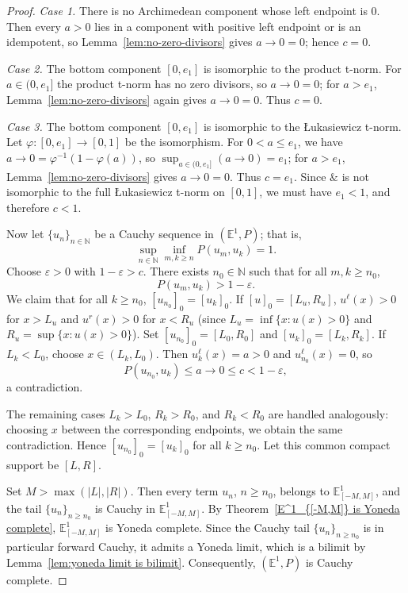 \documentclass[preprint,3p,times]{elsarticle}
\theoremstyle{plain}
\theoremstyle{definition}
\renewcommand{\phi}{\varphi}
\numberwithin{equation}{section}
\begin{document}
\begin{proof}
\emph{Case 1.} There is no Archimedean component whose left endpoint is $0$. Then every $a>0$ lies in a component with positive left endpoint or is an idempotent, so Lemma~\ref{lem:no-zero-divisors} gives $a\to0=0$; hence $c=0$.

\emph{Case 2.} The bottom component $[0,e_1]$ is isomorphic to the product t-norm. For $a\in(0,e_1]$ the product t-norm has no zero divisors, so $a\to0=0$; for $a>e_1$, Lemma~\ref{lem:no-zero-divisors} again gives $a\to0=0$. Thus $c=0$.

\emph{Case 3.} The bottom component $[0,e_1]$ is isomorphic to the {\L}ukasiewicz t-norm. Let $\phi:[0,e_1]\to[0,1]$ be the isomorphism. For $0<a\le e_1$, we have $a\to0=\phi^{-1}(1-\phi(a))$, so $\sup_{a\in(0,e_1]}(a\to0)=e_1$; for $a>e_1$, Lemma~\ref{lem:no-zero-divisors} gives $a\to0=0$. Thus $c=e_1$. Since $\&$ is not isomorphic to the full {\L}ukasiewicz t-norm on $[0,1]$, we must have $e_1<1$, and therefore $c<1$.



Now let $\{u_{n}\}_{n\in \mathbb{N}}$ be a Cauchy sequence in $(\mathbb{E}^{1},P)$; that is,
\[
\sup_{n\in \mathbb{N}}\inf_{m,k\geq n}P(u_{m},u_{k})=1.
\]
Choose $\varepsilon>0$ with $1-\varepsilon>c$. There exists $n_{0}\in \mathbb{N}$ such that for all $m,k\geq n_{0}$,
\begin{equation}\label{eq:cauchy}
P(u_{m},u_{k})>1-\varepsilon.
\end{equation}
We claim that for all $k\ge n_0$, $[u_{n_0}]_0=[u_k]_0$.  If \([u]_0=[L_u,R_u]\), $u^\ell(x)>0$ for $x>L_u$ and $u^r(x)>0$ for $x<R_u$ (since $L_u=\inf\{x:u(x)>0\}$ and $R_u=\sup\{x:u(x)>0\}$). Set $[u_{n_0}]_0=[L_0,R_0]$ and $[u_k]_0=[L_k,R_k]$. If \(L_k<L_0\), choose \(x\in(L_k,L_0)\). Then
\(u_k^\ell(x)=a>0\) and \(u_{n_0}^\ell(x)=0\), so
\[
P(u_{n_0},u_k)
 \le a\to0
 \le c
 <1-\varepsilon,
\]
a contradiction.

The remaining cases \(L_k>L_0\), \(R_k>R_0\), and \(R_k<R_0\) are handled analogously: choosing \(x\) between the corresponding endpoints, we obtain the same contradiction. Hence $[u_{n_0}]_0=[u_k]_0$ for all $k\ge n_0$. Let this common compact support be $[L,R]$.


Set \(M>\max(|L|,|R|)\). Then every term \(u_n\), \(n\ge n_0\), belongs to
\(\mathbb{E}^{1}_{[-M,M]}\), and the tail
\(\{u_n\}_{n\ge n_0}\) is Cauchy in
\(\mathbb{E}^{1}_{[-M,M]}\). By Theorem~\ref{E^1_{[-M,M]} is Yoneda complete}, \(\mathbb{E}^{1}_{[-M,M]}\) is Yoneda complete.  Since the Cauchy tail \(\{u_n\}_{n\ge n_0}\) is in particular forward Cauchy, it admits a Yoneda limit, which is a bilimit by Lemma~\ref{lem:yoneda limit is bilimit}. Consequently, $(\mathbb{E}^1,P)$ is Cauchy complete.


\end{proof}
\end{document}
